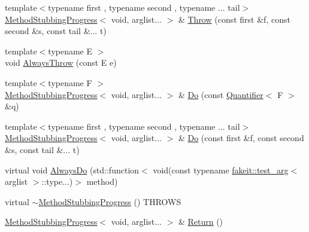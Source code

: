 \begin{DoxyCompactItemize}
\item 
{\footnotesize template$<$typename first , typename second , typename ... tail$>$ }\\\mbox{\hyperlink{structfakeit_1_1MethodStubbingProgress}{Method\+Stubbing\+Progress}}$<$ void, arglist... $>$ \& \mbox{\hyperlink{structfakeit_1_1MethodStubbingProgress_3_01void_00_01arglist_8_8_8_01_4_a2db97b61a39cc6cecc379f6d51234c8a}{Throw}} (const first \&f, const second \&s, const tail \&... t)
\item 
{\footnotesize template$<$typename E $>$ }\\void \mbox{\hyperlink{structfakeit_1_1MethodStubbingProgress_3_01void_00_01arglist_8_8_8_01_4_ad42a19c184f5efba2f997b30f57b9a24}{Always\+Throw}} (const E e)
\item 
{\footnotesize template$<$typename F $>$ }\\\mbox{\hyperlink{structfakeit_1_1MethodStubbingProgress}{Method\+Stubbing\+Progress}}$<$ void, arglist... $>$ \& \mbox{\hyperlink{structfakeit_1_1MethodStubbingProgress_3_01void_00_01arglist_8_8_8_01_4_a3091661d404ffecf2733281471d536c4}{Do}} (const \mbox{\hyperlink{structfakeit_1_1Quantifier}{Quantifier}}$<$ F $>$ \&q)
\item 
{\footnotesize template$<$typename first , typename second , typename ... tail$>$ }\\\mbox{\hyperlink{structfakeit_1_1MethodStubbingProgress}{Method\+Stubbing\+Progress}}$<$ void, arglist... $>$ \& \mbox{\hyperlink{structfakeit_1_1MethodStubbingProgress_3_01void_00_01arglist_8_8_8_01_4_a45b048006587b626f8220aa4b196de2a}{Do}} (const first \&f, const second \&s, const tail \&... t)
\item 
virtual void \mbox{\hyperlink{structfakeit_1_1MethodStubbingProgress_3_01void_00_01arglist_8_8_8_01_4_a3e7ae0c7da9cc0eb29d499b889805eb9}{Always\+Do}} (std\+::function$<$ void(const typename \mbox{\hyperlink{structfakeit_1_1test__arg}{fakeit\+::test\+\_\+arg}}$<$ arglist $>$\+::type...)$>$ method)
\item 
virtual \mbox{\hyperlink{structfakeit_1_1MethodStubbingProgress_3_01void_00_01arglist_8_8_8_01_4_a13f7ed59a8bd8e214f54b4a2946556ac}{$\sim$\+Method\+Stubbing\+Progress}} () T\+H\+R\+O\+WS
\item 
\mbox{\hyperlink{structfakeit_1_1MethodStubbingProgress}{Method\+Stubbing\+Progress}}$<$ void, arglist... $>$ \& \mbox{\hyperlink{structfakeit_1_1MethodStubbingProgress_3_01void_00_01arglist_8_8_8_01_4_ada79edce54db3ffaa88985829f9b5558}{Return}} ()
\item 

\end{DoxyCompactItemize}
